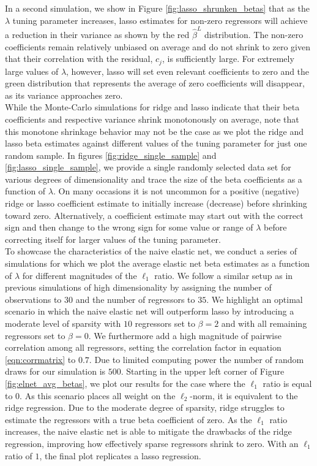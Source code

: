\noindent In a second simulation, we show in Figure \ref{fig:lasso_shrunken_betas} that as the $\lambda$ tuning parameter increases, lasso estimates for non-zero regressors will achieve a reduction in their variance as shown by the red $\hat{\beta}^L$ distribution. The non-zero coefficients remain relatively unbiased on average and do not shrink to zero given that their correlation with the residual, $c_j$, is sufficiently large. For extremely large values of $\lambda$, however, lasso will set even relevant coefficients to zero and the green distribution that represents the average of zero coefficients will disappear, as its variance approaches zero. 
\\

\noindent While the Monte-Carlo simulations for ridge and lasso indicate that their beta coefficients and respective variance shrink monotonously on average, note that this monotone shrinkage behavior may not be the case as we plot the ridge and lasso beta estimates against different values of the tuning parameter for just one random sample. In figures \ref{fig:ridge_single_sample} and \ref{fig:lasso_single_sample}, we provide a single randomly selected data set for various degrees of dimensionality and trace the size of the beta coefficients as a function of $\lambda$. On many occasions it is not uncommon for a positive (negative) ridge or lasso coefficient estimate to initially increase (decrease) before shrinking toward zero. Alternatively, a coefficient estimate may start out with the correct sign and then change to the wrong sign for some value or range of $\lambda$ before correcting itself for larger values of the tuning parameter.\\ 

\noindent To showcase the characteristics of the naive elastic net, we conduct a series of simulations for which we plot the average elastic net beta estimates as a function of $\lambda$ for different magnitudes of the $\ell_1$ ratio. We follow a similar setup as in previous simulations of high dimensionality by assigning the number of observations to $30$ and the number of regressors to $35$. We highlight an optimal scenario in which the naive elastic net will outperform lasso by introducing a moderate level of sparsity with $10$ regressors set to $\beta=2$ and with all remaining regressors set to $\beta=0$. We furthermore add a high magnitude of pairwise correlation among all regressors, setting the correlation factor in equation \eqref{eqn:corrmatrix} to $0.7$. Due to limited computing power the number of random draws for our simulation is $500$. Starting in the upper left corner of Figure \ref{fig:elnet_avg_betas}, we plot our results for the case where the $\ell_1$ ratio is equal to $0$. As this scenario places all weight on the $\ell_2$-norm, it is equivalent to the ridge regression. Due to the moderate degree of sparsity, ridge struggles to estimate the regressors with a true beta coefficient of zero. As the $\ell_1$ ratio increases, the naive elastic net is able to mitigate the drawbacks of the ridge regression, improving how effectively sparse regressors shrink to zero. With an $\ell_1$ ratio of $1$, the final plot replicates a lasso regression. \\

